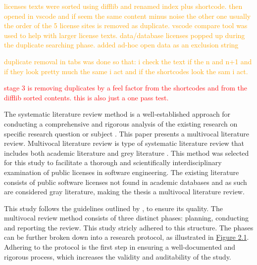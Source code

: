 \textcolor{orange}{licenses texts were sorted using difflib and renamed index plus shortcode. then opened in vscode and if seem the same content minus noise the other one usually the order of the 5 license sites is removed as duplicate. vscode compare tool was used to help with larger license texts. data/database licenses popped up during the duplicate searching phase. added ad-hoc open data as an exclusion string}

\textcolor{orange}{duplicate removal in tabs was done so that: i check the text if the n and n+1 and if they look pretty much the same i act and if the shortcodes look the sam i act.}

\textcolor{red}{stage 3 is removing duplicates by a feel factor from the shortcodes and from the difflib sorted contents. this is also just a one pass test.}

The systematic literature review method is a well-established approach for conducting a comprehensive and rigorous analysis of the existing research on specific research question or subject \citep{kitchenham2007}. This paper presents a multivocal literature review. Multivocal literature review is type of systematic literature review that includes both academic literature and grey literature \citep{mantyla2019}. This method was selected for this study to facilitate a thorough and scientifically interdisciplinary examination of public licenses in software engineering. The existing literature consists of public software licenses not found in academic databases and as such are considered gray literature, making the thesis a multivocal literature review.

This study follows the guidelines outlined by \cite{kitchenham2007}, to ensure its quality. The multivocal review method consists of three distinct phases: planning, conducting and reporting the review. This study stricly adhered to this structure. The phases can be further broken down into a research protocol, as illustrated in \hyperref[fig:slrphases]{Figure 2.1}. Adhering to the protocol is the first step in ensuring a well-documented and rigorous process, which increases the validity and auditability of the study.

